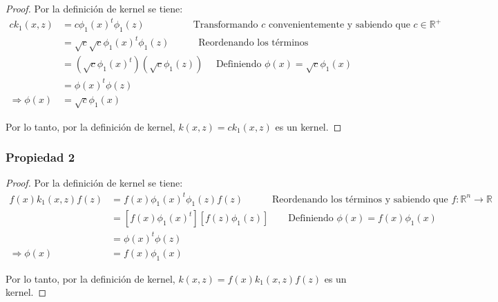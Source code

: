 \documentclass{article}
\theoremstyle{mytheoremstyle}
\theoremstyle{mytheoremstyle}
\theoremstyle{myproblemstyle}
\begin{document}
\begin{proof} Por la definición de kernel se tiene:
  \begin{align*}
    ck_1(x, z)          & = c\phi_1(x)^t\phi_1(z) \qquad \qquad \quad \text{Transformando $c$ convenientemente y sabiendo que $c\in \mathbb{R}^+$} \\
                        & = \sqrt{c}\sqrt{c} \phi_1(x)^t\phi_1(z) \qquad \quad \text{Reordenando los términos }                                    \\
                        & = (\sqrt{c}\phi_1(x)^t) (\sqrt{c}\phi_1(z)) \quad \text{ Definiendo } \phi(x) = \sqrt{c}\phi_1(x)                        \\
                        & = \phi(x)^t\phi(z)                                                                                                       \\
    \Rightarrow \phi(x) & = \sqrt{c}\phi_1(x)
  \end{align*}

  Por lo tanto, por la definición de kernel, $k(x, z) = ck_1(x, z)$ es un kernel.

\end{proof}

\subsubsection*{Propiedad 2}

\begin{proof} Por la definición de kernel se tiene:
  \begin{align*}
    f(x)k_1(x, z)f(z)   & = f(x)\phi_1(x)^t\phi_1(z)f(z) \qquad \quad \text{Reordenando los términos y sabiendo que $f:\mathbb{R}^n\rightarrow \mathbb{R}$} \\
                        & = [f(x)\phi_1(x)^t] [f(z)\phi_1(z)] \qquad \text{Definiendo } \phi(x) = f(x)\phi_1(x)                                             \\
                        & = \phi(x)^t\phi(z)                                                                                                                \\
    \Rightarrow \phi(x) & = f(x)\phi_1(x)
  \end{align*}

  Por lo tanto, por la definición de kernel, $k(x, z) = f(x)k_1(x, z)f(z)$ es un kernel.

\end{proof}
\end{document}

